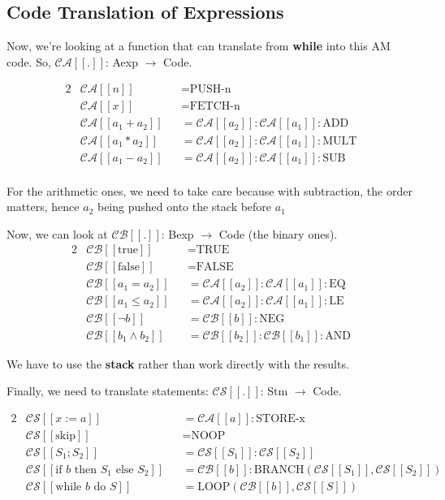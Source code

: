 \documentclass[11pt,a4paper,titlepage,dvipsnames,cmyk]{scrartcl}
\begin{document}
\subsection{Code Translation of Expressions}%
\label{sub:code-translation}
Now, we're looking at a function that can translate from \textbf{while}
into this AM code. So, $\mathcal{CA} [\![.]\!]$: Aexp $\rightarrow$ Code.

\begin{alignat*}{2}
   &\mathcal{CA} [\![n]\!] &&= \text{PUSH-n } \\
   &\mathcal{CA} [\![x]\!] &&= \text{FETCH-n } \\
   &\mathcal{CA} [\![a_1 + a_2]\!] &&= \mathcal{CA}[\![a_2]\!] :
   \mathcal{CA}[\![a_1]\!]:\text{ADD} \\
   &\mathcal{CA} [\![a_1 * a_2]\!] &&= \mathcal{CA}[\![a_2]\!] :
   \mathcal{CA}[\![a_1]\!]:\text{MULT} \\
   &\mathcal{CA} [\![a_1 - a_2]\!] &&= \mathcal{CA}[\![a_2]\!] :
   \mathcal{CA}[\![a_1]\!]:\text{SUB} \\
\end{alignat*}

For the arithmetic ones, we need to take care because with subtraction,
the order matters, hence $a_2$ being pushed onto the stack before $a_1$

Now, we can look at $\mathcal{CB} [\![.]\!]$: Bexp $\rightarrow$ Code (the
binary ones).
\begin{alignat*}{2}
   &\mathcal{CB} [\![\text{true}]\!] &&= \text{TRUE} \\
   &\mathcal{CB} [\![\text{false}]\!] &&= \text{FALSE} \\
   &\mathcal{CB} [\![a_1 = a_2]\!] &&=
   \mathcal{CA}[\![a_2]\!]:\mathcal{CA}[\![a_1]\!]:\text{EQ} \\
   &\mathcal{CB} [\![a_1 \le a_2]\!] &&=
   \mathcal{CA}[\![a_2]\!]:\mathcal{CA}[\![a_1]\!]:\text{LE}\\
   &\mathcal{CB}[\![\neg b]\!] &&= \mathcal{CB}[\![b]\!]:\text{NEG} \\
   &\mathcal{CB} [\![b_1 \wedge b_2]\!] &&=
   \mathcal{CB}[\![b_2]\!]:\mathcal{CB}[\![b_1]\!]:\text{AND}
\end{alignat*}

We have to use the \textbf{stack} rather than work directly with the
results.

Finally, we need to translate statements: $\mathcal{CS} [\![.]\!]$: Stm
$\rightarrow$ Code.

\begin{alignat*}{2}
    &\mathcal{CS}[\![x:=a]\!] &&= \mathcal{CA}[\![a]\!]:\text{STORE-x} \\
    &\mathcal{CS}[\![\text{skip}]\!] &&= \text{NOOP} \\
    &\mathcal{CS}[\![S_1;S_2]\!] &&= \mathcal{CS}[\![S_1]]:\mathcal{CS}[\![S_2]] \\
    &\mathcal{CS}[\![\text{if } b \text{ then } S_1 \text{ else } S_2]\!] &&= \mathcal{CB}[\![b]\!]:\text{BRANCH}(\mathcal{CS}[\![S_1]\!],\mathcal{CS}[\![S_2]\!]) \\
    &\mathcal{CS}[\![\text{while } b \text{ do } S]\!] &&= \text{LOOP}(\mathcal{CB}[\![b]\!],\mathcal{CS}[\![S]\!])
\end{alignat*}
\end{document}
